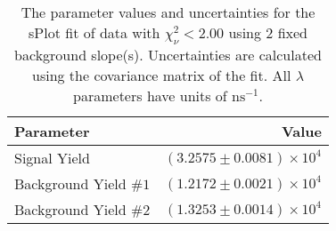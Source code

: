 
\begin{table}
    \begin{center}
        \begin{tabular}{lr}\toprule
            Parameter & Value \\\midrule
            Signal Yield & $(3.2575 \pm 0.0081) \times 10^{4}$ \\
            Background Yield $\#1$ & $(1.2172 \pm 0.0021) \times 10^{4}$ \\
            Background Yield $\#2$ & $(1.3253 \pm 0.0014) \times 10^{4}$ \\\bottomrule
        \end{tabular}
        \caption{The parameter values and uncertainties for the sPlot fit of data with $\chi^2_\nu < 2.00$ using 2 fixed background slope(s). Uncertainties are calculated using the covariance matrix of the fit. All $\lambda$ parameters have units of $\si{\nano\second}^{-1}$.}
    \end{center}
\end{table}
